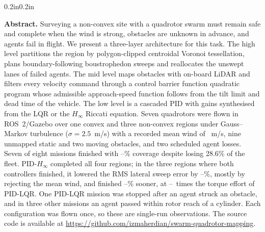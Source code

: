 \documentclass[10pt,letterpaper]{article}
\newcommand{\LatRedDoneMin}{\fpeval{round(100*min(1-\LatrmsLshapeHinf/\LatrmsLshapeLqr,1-\LatrmsUshapeHinf/\LatrmsUshapeLqr,1-\LatrmsPlusHinf/\LatrmsPlusLqr),0)}}
\newcommand{\LatRedDoneMax}{\fpeval{round(100*max(1-\LatrmsLshapeHinf/\LatrmsLshapeLqr,1-\LatrmsUshapeHinf/\LatrmsUshapeLqr,1-\LatrmsPlusHinf/\LatrmsPlusLqr),0)}}
\newcommand{\Hinf}{PID-$H_\infty$}
\newcommand{\LQR}{PID-LQR}
\begin{document}
\vspace{0.6ex}
\begin{adjustwidth}{0.2in}{0.2in}
{\fontsize{9}{11}\selectfont\noindent\textbf{Abstract.}
Surveying a non-convex site with a quadrotor swarm must remain safe and complete when the
wind is strong, obstacles are unknown in advance, and agents fail in flight. We present a
three-layer architecture for this task. The high level partitions the region by polygon-clipped
centroidal Voronoi tessellation, plans boundary-following boustrophedon sweeps and reallocates
the unswept lanes of failed agents. The mid level maps obstacles with on-board LiDAR and filters
every velocity command through a control barrier function quadratic program whose
admissible approach-speed function follows from the tilt limit and dead time of the vehicle. The low
level is a cascaded PID with gains synthesised from the LQR or the $H_\infty$ Riccati equation.
Seven quadrotors were flown in ROS~2/Gazebo over one convex and three non-convex regions under
Gauss--Markov turbulence ($\sigma=2.5$~m/s) with a recorded mean wind of \WindMeanMag~m/s, nine unmapped
static and two moving obstacles, and two scheduled agent losses. Seven of eight missions
finished with \CovMin--\CovMax\% coverage despite losing 28.6\% of the fleet. \Hinf{} completed
all four regions; in the three regions where both controllers finished, it lowered the RMS lateral
sweep error by \LatRedDoneMin--\LatRedDoneMax\%, mostly by rejecting the mean wind, and finished
\TimeRedMin--\TimeRedMax\% sooner, at \EffRatioMin--\EffRatioMax\ times the torque effort of \LQR{}.
One \LQR{} mission was stopped after an agent struck an obstacle, and in three other missions an
agent passed within rotor reach of a cylinder. Each configuration was flown once, so these are
single-run observations. The source code is available at
\url{https://github.com/izmaherdian/swarm-quadrotor-mapping}.
\par}
\end{adjustwidth}
\end{document}
